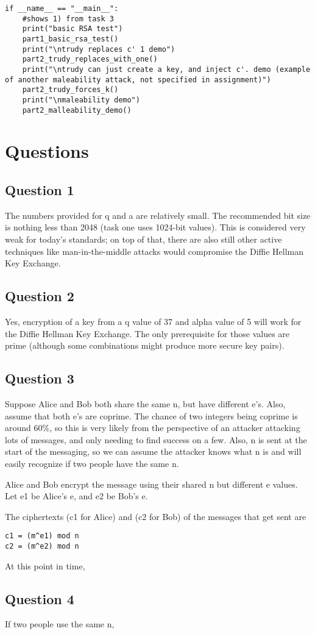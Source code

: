 \documentclass[11pt]{article}
\begin{document}
\begin{lstlisting}
if __name__ == "__main__":
    #shows 1) from task 3
    print("basic RSA test")
    part1_basic_rsa_test()
    print("\ntrudy replaces c' 1 demo")
    part2_trudy_replaces_with_one()
    print("\ntrudy can just create a key, and inject c'. demo (example of another maleability attack, not specified in assignment)")
    part2_trudy_forces_k()
    print("\nmaleability demo")
    part2_malleability_demo()
\end{lstlisting}


\section*{Questions}
\subsection*{Question 1}

The numbers provided for q and a are relatively small. The recommended bit size is nothing less than 2048 (task one uses 1024-bit values). This is considered very weak for today's standards; on top of that, there are also still other active techniques like man-in-the-middle attacks would compromise the Diffie Hellman Key Exchange.

\subsection*{Question 2}

Yes, encryption of a key from a q value of 37 and alpha value of 5 will work for the Diffie Hellman Key Exchange. The only prerequisite for those values are prime (although some combinations might produce more secure key pairs).

\subsection*{Question 3}

Suppose Alice and Bob both share the same n, but have different e's. Also, assume that both e's are coprime. The chance of two integers being coprime is around 60\%, so this is very likely from the perspective of an attacker attacking lots of messages, and only needing to find success on a few. Also, n is sent at the start of the messaging, so we can assume the attacker knows what n is and will easily recognize if two people have the same n.

Alice and Bob encrypt the message using their shared n but different e values. Let e1 be Alice’s e, and e2 be Bob’s e.

The ciphertexts (c1 for Alice) and (c2 for Bob) of the messages that get sent are
\begin{verbatim}
c1 = (m^e1) mod n 
c2 = (m^e2) mod n
\end{verbatim}

At this point in time, 


\subsection*{Question 4}

If two people use the same n, 
\end{document}
